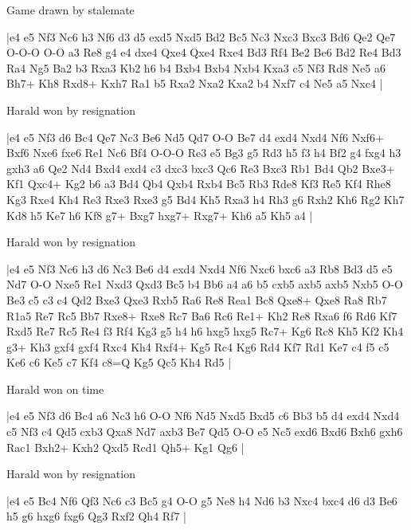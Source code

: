 \showboard

Game drawn by stalemate

\makegametitle
|e4 e5 Nf3 Nc6 h3 Nf6 d3 d5 exd5 Nxd5 Bd2 Bc5 Nc3 Nxc3 Bxc3 Bd6 Qe2 Qe7 O-O-O O-O a3 Re8 g4 e4 dxe4 Qxe4 Qxe4 Rxe4 Bd3 Rf4 Be2 Be6 Bd2 Re4 Bd3 Ra4 Ng5 Ba2 b3 Rxa3 Kb2 h6 b4 Bxb4 Bxb4 Nxb4 Kxa3 c5 Nf3 Rd8 Ne5 a6 Bh7+ Kh8 Rxd8+ Kxh7 Ra1 b5 Rxa2 Nxa2 Kxa2 b4 Nxf7 c4 Ne5 a5 Nxc4  |

\showboard

Harald won by resignation

\makegametitle
|e4 e5 Nf3 d6 Bc4 Qe7 Nc3 Be6 Nd5 Qd7 O-O Be7 d4 exd4 Nxd4 Nf6 Nxf6+ Bxf6 Nxe6 fxe6 Re1 Nc6 Bf4 O-O-O Re3 e5 Bg3 g5 Rd3 h5 f3 h4 Bf2 g4 fxg4 h3 gxh3 a6 Qe2 Nd4 Bxd4 exd4 c3 dxc3 bxc3 Qc6 Re3 Bxc3 Rb1 Bd4 Qb2 Bxe3+ Kf1 Qxc4+ Kg2 b6 a3 Bd4 Qb4 Qxb4 Rxb4 Bc5 Rb3 Rde8 Kf3 Re5 Kf4 Rhe8 Kg3 Rxe4 Kh4 Re3 Rxe3 Rxe3 g5 Bd4 Kh5 Rxa3 h4 Rh3 g6 Rxh2 Kh6 Rg2 Kh7 Kd8 h5 Ke7 h6 Kf8 g7+ Bxg7 hxg7+ Rxg7+ Kh6 a5 Kh5 a4  |

\showboard

Harald won by resignation

\makegametitle
|e4 e5 Nf3 Nc6 h3 d6 Nc3 Be6 d4 exd4 Nxd4 Nf6 Nxc6 bxc6 a3 Rb8 Bd3 d5 e5 Nd7 O-O Nxe5 Re1 Nxd3 Qxd3 Bc5 b4 Bb6 a4 a6 b5 cxb5 axb5 axb5 Nxb5 O-O Be3 c5 c3 c4 Qd2 Bxe3 Qxe3 Rxb5 Ra6 Re8 Rea1 Bc8 Qxe8+ Qxe8 Ra8 Rb7 R1a5 Re7 Rc5 Bb7 Rxe8+ Rxe8 Rc7 Ba6 Rc6 Re1+ Kh2 Re8 Rxa6 f6 Rd6 Kf7 Rxd5 Re7 Rc5 Re4 f3 Rf4 Kg3 g5 h4 h6 hxg5 hxg5 Rc7+ Kg6 Rc8 Kh5 Kf2 Kh4 g3+ Kh3 gxf4 gxf4 Rxc4 Kh4 Rxf4+ Kg5 Rc4 Kg6 Rd4 Kf7 Rd1 Ke7 c4 f5 c5 Ke6 c6 Ke5 c7 Kf4 c8=Q Kg5 Qc5 Kh4 Rd5  |

\showboard

Harald won on time

\makegametitle
|e4 e5 Nf3 d6 Bc4 a6 Nc3 h6 O-O Nf6 Nd5 Nxd5 Bxd5 c6 Bb3 b5 d4 exd4 Nxd4 c5 Nf3 c4 Qd5 cxb3 Qxa8 Nd7 axb3 Be7 Qd5 O-O e5 Nc5 exd6 Bxd6 Bxh6 gxh6 Rac1 Bxh2+ Kxh2 Qxd5 Rcd1 Qh5+ Kg1 Qg6  |

\showboard

Harald won by resignation

\makegametitle
|e4 e5 Bc4 Nf6 Qf3 Nc6 c3 Bc5 g4 O-O g5 Ne8 h4 Nd6 b3 Nxc4 bxc4 d6 d3 Be6 h5 g6 hxg6 fxg6 Qg3 Rxf2 Qh4 Rf7  |

